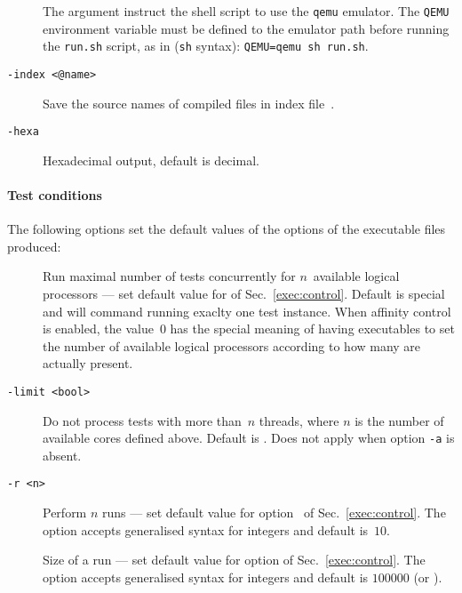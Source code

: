 \begin{description}
The argument  instruct the shell script to use the \texttt{qemu}
emulator. The \texttt{QEMU} environment variable must be defined to the
emulator path before running the \texttt{run.sh} script, as in (\texttt{sh} syntax): \verb+QEMU=qemu sh run.sh+.


\item[{\tt -index <@name>}] Save the source names of compiled files in index
file~.
\item[{\tt -hexa}] Hexadecimal output, default is decimal.
\end{description}

\paragraph*{Test conditions\label{litmus:option:sec}}
The following options set the default values of
the options of the executable files produced:
\begin{description}
\item[]Run maximal number of tests concurrently for $n$~available
logical processors ---
set default value for  of Sec.~\ref{exec:control}.
Default is special and will command running exaclty one test instance.
When affinity control is enabled, the value~$0$ has the special
meaning of having executables to set the
number of available logical processors according to
how many are actually present.
\item[{\tt -limit <bool>}] Do not process tests with more than~$n$
threads, where $n$ is the number of available cores defined above.
Default is .  Does not apply when option \texttt{-a} is absent.
\item[{\tt -r <n>}] Perform $n$ runs --- set default value for
option~ of Sec.~\ref{exec:control}.
The option accepts generalised syntax for integers and
default is~$10$.
\item[]Size of a run --- set default value for
option  of Sec.~\ref{exec:control}.
The option accepts generalised syntax for integers and
default is $100000$ (or ).
\end{description}


